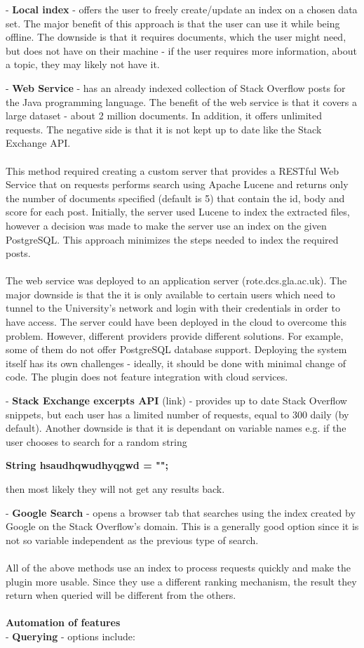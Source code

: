 \documentclass{l4proj}
\begin{document}
- \textbf{Local index} - offers the user to freely create/update an index on a chosen data set. The major benefit of this approach is that the user can use it while being offline. The downside is that it requires documents, which the user might need, but does not have on their machine - if the user requires more information, about a topic, they may likely not have it.  

- \textbf{Web Service} - has an already indexed collection of Stack Overflow posts for the Java programming language.  The benefit of the web service is that it covers a large dataset - about 2 million documents. In addition, it offers unlimited requests. The negative side is that it is not kept up to date like the Stack Exchange API. 
\\
\\
This method required creating a custom server that provides a RESTful Web Service that on requests performs search using Apache Lucene and returns only the number of documents specified (default is 5) that contain the id, body and score for each post. 
Initially, the server used Lucene to index the extracted files, however a decision was made to make the server use an index on the given PostgreSQL. This approach minimizes the steps needed to index the required posts.
\\
\\
The web service was deployed to an application server (rote.dcs.gla.ac.uk). The major downside is that the it is only available to certain users which need to tunnel to the University's network and login with their credentials in order to have access. The server could have been deployed in the cloud to overcome this problem. However, different providers provide different solutions. For example, some of them do not offer PostgreSQL database support. Deploying the system itself has its own challenges - ideally, it should be done with minimal change of code. The plugin does not feature integration with cloud services. 

- \textbf{Stack Exchange excerpts API} (link) - provides up to date Stack Overflow snippets, but each user has a limited number of requests, equal to 300 daily (by default). Another downside is that it is dependant on variable names e.g. if the user chooses to search for a random string

\textbf{String hsaudhqwudhyqgwd = "";}

then most likely they will not get any results back.

- \textbf{Google Search} - opens a browser tab that searches using the index created by Google on the Stack Overflow's domain. This is a generally good option since it is not so variable independent as the previous type of search.
\\
\\
All of the above methods use an index to process requests quickly and make the plugin more usable. Since they use a different ranking mechanism, the result they return when queried will be different from the others.
\\
\\
\textbf{Automation of features}\\
- \textbf{Querying} - options include:
\end{document}
